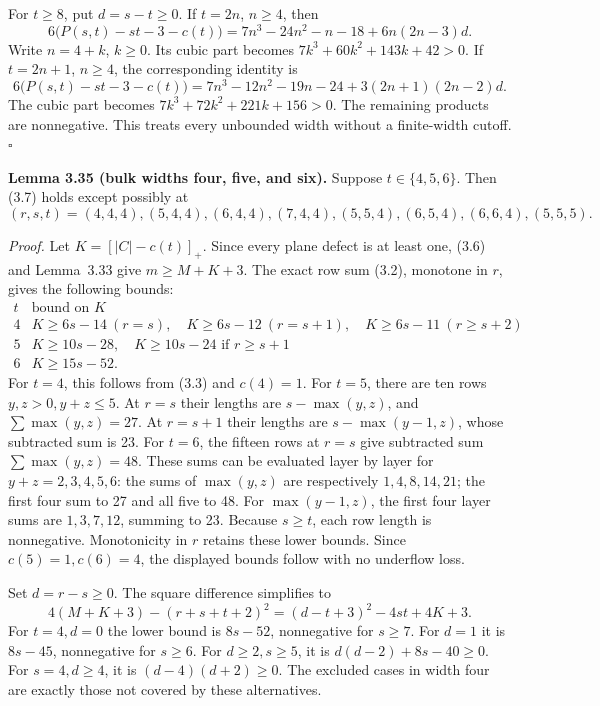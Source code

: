\documentclass[11pt]{article}
\begin{document}
For \(t\ge8\), put \(d=s-t\ge0\). If \(t=2n\), \(n\ge4\), then
\[
6\big(P(s,t)-st-3-c(t)\big)
=7n^3-24n^2-n-18+6n(2n-3)d.
\]
Write \(n=4+k\), \(k\ge0\). Its cubic part becomes \(7k^3+60k^2+143k+42>0\). If \(t=2n+1\), \(n\ge4\), the corresponding identity is
\[
6\big(P(s,t)-st-3-c(t)\big)
=7n^3-12n^2-19n-24+3(2n+1)(2n-2)d.
\]
The cubic part becomes \(7k^3+72k^2+221k+156>0\). The remaining products are nonnegative. This treats every unbounded width without a finite-width cutoff. \ensuremath{\square}

\label{res:A.32}
\textbf{Lemma 3.35 (bulk widths four, five, and six).} Suppose \(t\in\{4,5,6\}\). Then (3.7) holds except possibly at
\[
(r,s,t)=(4,4,4),(5,4,4),(6,4,4),(7,4,4),
(5,5,4),(6,5,4),(6,6,4),(5,5,5).
\]

\emph{Proof.} Let \(K=[|C|-c(t)]_+\). Since every plane defect is at least one, (3.6) and Lemma~3.33 give
\(m\ge M+K+3\).
The exact row sum (3.2), monotone in \(r\), gives the following bounds:
\[
\begin{array}{c|c}
t&\text{bound on }K\\\hline
4&K\ge6s-14\ (r=s),\quad K\ge6s-12\ (r=s+1),\quad K\ge6s-11\ (r\ge s+2)\\
5&K\ge10s-28,\quad K\ge10s-24\text{ if }r\ge s+1\\
6&K\ge15s-52.
\end{array}
\]
For \(t=4\), this follows from (3.3) and \(c(4)=1\). For \(t=5\), there are ten rows \(y,z>0,y+z\le5\). At \(r=s\) their lengths are \(s-\max(y,z)\), and \(\sum\max(y,z)=27\). At \(r=s+1\) their lengths are \(s-\max(y-1,z)\), whose subtracted sum is 23. For \(t=6\), the fifteen rows at \(r=s\) give subtracted sum \(\sum\max(y,z)=48\). These sums can be evaluated layer by layer for \(y+z=2,3,4,5,6\): the sums of \(\max(y,z)\) are respectively \(1,4,8,14,21\); the first four sum to 27 and all five to 48. For \(\max(y-1,z)\), the first four layer sums are \(1,3,7,12\), summing to 23. Because \(s\ge t\), each row length is nonnegative. Monotonicity in \(r\) retains these lower bounds. Since \(c(5)=1,c(6)=4\), the displayed bounds follow with no underflow loss.

Set \(d=r-s\ge0\). The square difference simplifies to
\[
4(M+K+3)-(r+s+t+2)^2
=(d-t+3)^2-4st+4K+3.
\]
For \(t=4,d=0\) the lower bound is \(8s-52\), nonnegative for \(s\ge7\). For \(d=1\) it is \(8s-45\), nonnegative for \(s\ge6\). For \(d\ge2,s\ge5\), it is \(d(d-2)+8s-40\ge0\). For \(s=4,d\ge4\), it is \((d-4)(d+2)\ge0\). The excluded cases in width four are exactly those not covered by these alternatives.
\end{document}
